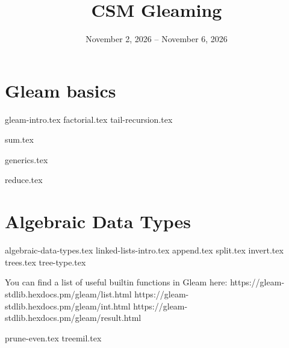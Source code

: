 \documentclass{exam}
\title{CSM Gleaming}
\date{November 2, 2026 -- November 6, 2026}
\begin{document}
\maketitle

\section{Gleam basics}
\begin{blocksection}
\end{blocksection}
\begin{questions}
    {gleam-intro.tex}
    {factorial.tex}
    \newpage
    {tail-recursion.tex}
    \par\vspace*{2\baselineskip}
    {sum.tex}
    \par\vspace*{3\baselineskip}
    {generics.tex}
    \par\vspace*{2\baselineskip}
    {reduce.tex}
\end{questions}

\newpage
\section{Algebraic Data Types}
\begin{questions}
    {algebraic-data-types.tex}
    {linked-lists-intro.tex}
    {append.tex}
    {split.tex}
    {invert.tex}
    \newpage
    {trees.tex}
    {tree-type.tex}

    You can find a list of useful builtin functions in Gleam here:\newline
    https://gleam-stdlib.hexdocs.pm/gleam/list.html\newline
    https://gleam-stdlib.hexdocs.pm/gleam/int.html\newline
    https://gleam-stdlib.hexdocs.pm/gleam/result.html\newline

    {prune-even.tex}
    {treemil.tex}
\end{questions}
\end{document}
